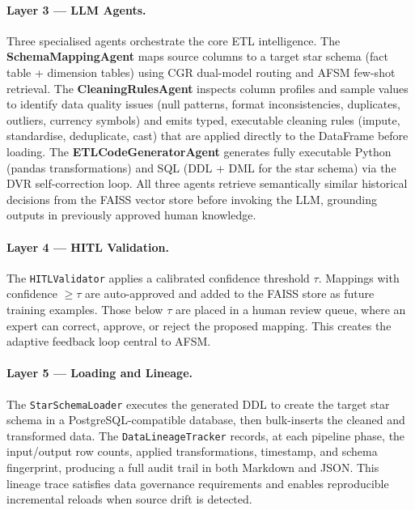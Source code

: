 \documentclass[9pt,a4paper,twocolumn,twoside]{rho-class/rho}
\begin{document}
    \paragraph{Layer 3 — LLM Agents.}
    Three specialised agents orchestrate the core ETL intelligence. The \textbf{SchemaMappingAgent} maps source columns to a target star schema (fact table + dimension tables) using CGR dual-model routing and AFSM few-shot retrieval. The \textbf{CleaningRulesAgent} inspects column profiles and sample values to identify data quality issues (null patterns, format inconsistencies, duplicates, outliers, currency symbols) and emits typed, executable cleaning rules (impute, standardise, deduplicate, cast) that are applied directly to the DataFrame before loading. The \textbf{ETLCodeGeneratorAgent} generates fully executable Python (pandas transformations) and SQL (DDL + DML for the star schema) via the DVR self-correction loop. All three agents retrieve semantically similar historical decisions from the FAISS vector store before invoking the LLM, grounding outputs in previously approved human knowledge.

    \paragraph{Layer 4 — HITL Validation.}
    The \texttt{HITLValidator} applies a calibrated confidence threshold $\tau$. Mappings with confidence $\geq \tau$ are auto-approved and added to the FAISS store as future training examples. Those below $\tau$ are placed in a human review queue, where an expert can correct, approve, or reject the proposed mapping. This creates the adaptive feedback loop central to AFSM.

    \paragraph{Layer 5 — Loading and Lineage.}
    The \texttt{StarSchemaLoader} executes the generated DDL to create the target star schema in a PostgreSQL-compatible database, then bulk-inserts the cleaned and transformed data. The \texttt{DataLineageTracker} records, at each pipeline phase, the input/output row counts, applied transformations, timestamp, and schema fingerprint, producing a full audit trail in both Markdown and JSON. This lineage trace satisfies data governance requirements and enables reproducible incremental reloads when source drift is detected.

\end{document}
